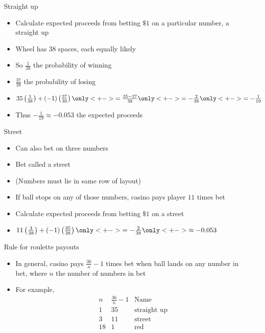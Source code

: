 \documentclass[handout]{beamer}
\theoremstyle{definition}
\begin{document}
\begin{frame}{Straight up}
\begin{itemize}
\item Calculate expected proceeds from betting $\$1$
on a particular number, a \alert{straight up}
\item Wheel has $38$ spaces, each equally likely
\item So $\frac{1}{38}$ the probability of winning
\item $\frac{37}{38}$ the probability of losing
\item $35\left(\frac{1}{38}\right)
+\left(-1\right)\left(\frac{37}{38}\right)
\only<+->{=\frac{35-37}{38}}
\only<+->{=-\frac{2}{38}}
\only<+->{=-\frac{1}{19}}$
\item Thus $-\frac{1}{19}\approx -0.053$ the expected proceeds
\end{itemize}
\end{frame}

\begin{frame}{Street}
\begin{itemize}
\item Can also bet on three numbers
\item Bet called a \alert{street}
\item (Numbers must lie in same row of \alert{layout})
\item If ball stops on any of those numbers, casino
pays player $11$ times bet
\item Calculate expected proceeds from betting $\$1$ on a street
\item $11\left(\frac{3}{38}\right)+\left(-1\right)\left(\frac{35}{38}\right)
\only<+->{=-\frac{2}{38}}
\only<+->{\approx -0.053}$
\end{itemize}
\end{frame}

\begin{frame}{Rule for roulette payouts} 
\begin{itemize}
\item In general, casino pays $\frac{36}{n}-1$ times
bet when ball lands on any number in bet, where $n$
the number of numbers in bet
\item For example,
\[\begin{array}{l|c|l}
n&\frac{36}{n}-1&\text{Name}\\\hline
1&35&\text{straight up}\\
3&11&\text{street}\\
18&1&\text{red}
\end{array}\]
\end{itemize}
\end{frame}
\end{document}
